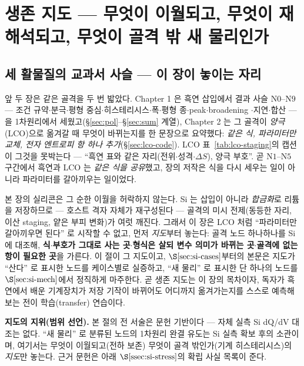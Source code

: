 \section{생존 지도 --- 무엇이 이월되고, 무엇이 재해석되고, 무엇이 골격 밖 새 물리인가}\label{sec:si-map}

\subsection{세 활물질의 교과서 사슬 --- 이 장이 놓이는 자리}\label{ssec:si-arc}
앞 두 장은 같은 골격을 두 번 밟았다. Chapter 1 은 흑연 삽입에서 결과 사슬 $\mathrm{N0}$--$\mathrm{N9}$
--- 조건 규약$\cdot$분극$\cdot$평형 중심$\cdot$히스테리시스$\cdot$폭$\cdot$평형 종$\cdot$peak$\cdot$broadening
$\cdot$지연$\cdot$합산 --- 을 1차원리에서 세웠고(\S\ref{sec:pol}--\S\ref{sec:sum} 계열), Chapter 2 는 그
골격이 \emph{양극}(LCO)으로 옮겨갈 때 무엇이 바뀌는지를 한 문장으로 요약했다: \emph{같은 식, 파라미터만
교체, 전자 엔트로피 항 하나 추가}(\S\ref{sec:lco-code}). LCO 표~\ref{tab:lco-staging}의 캡션이
그것을 못박는다 --- ``흑연 표와 같은 자리(전위$\cdot$성격$\cdot\Delta S$), 양극 부호''. 곧 $\mathrm{N1}$--$\mathrm{N5}$
구간에서 흑연과 LCO 는 \emph{같은 식을 공유}했고, 장의 저작은 식을 다시 세우는 일이 아니라 파라미터를
갈아끼우는 일이었다.

본 장의 실리콘은 그 순한 이월을 허락하지 않는다. Si 는 삽입이 아니라 \emph{합금화}로 리튬을 저장하므로
--- 호스트 격자 자체가 재구성된다 --- 골격의 미시 전제(동등한 자리, 이산 staging, 얕은 부피 변화)가
여럿 깨진다. 그래서 이 장은 LCO 처럼 ``파라미터만 갈아끼우면 된다'' 로 시작할 수 없고, 먼저 \emph{지도}부터
놓는다: 골격 노드 하나하나를 Si 에 대조해, \textbf{식$\cdot$부호가 그대로 사는 곳}$\cdot$\textbf{형식은
살되 변수 의미가 바뀌는 곳}$\cdot$\textbf{골격에 없는 항이 필요한 곳}을 가른다. 이 절이 그 지도이고,
$\S\ref{sec:si-cases}$부터의 본문은 지도가 ``산다'' 로 표시한 노드를 케이스별로 실증하고, ``새 물리'' 로
표시한 단 하나의 노드를 $\S\ref{sec:si-mech}$에서 정직하게 마주한다. 곧 생존 지도는 이 장의 목차이자,
독자가 흑연에서 배운 기계장치가 저장 기작이 바뀌어도 어디까지 옮겨가는지를 스스로 예측해 보는 전이
학습(transfer) 연습이다.

\begin{bgbox}
\textbf{지도의 지위(범위 선언).} 본 절의 전 서술은 문헌 기반이다 --- 자체 실측 Si dQ/dV 대조는 없다.
``새 물리'' 로 분류된 노드의 1차원리 완결 유도는 Si 실측 확보 후의 소관이며, 여기서는 무엇이
이월되고(전하 보존) 무엇이 골격 밖인가(기계 히스테리시스)의 \emph{지도}만 놓는다. 근거 문헌은 아래
$\S\ref{ssec:si-stress}$의 확립 사실 목록이 준다.
\end{bgbox}

